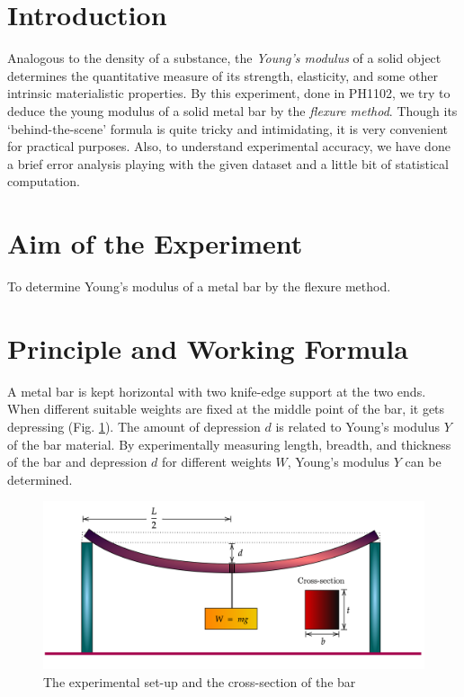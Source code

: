 \documentclass[11pt]{scrartcl}
\begin{document}
\section{Introduction}
\fontsize{12}{18}\selectfont
Analogous to the density of a substance, the \emph{Young's modulus} of a solid object determines the quantitative measure of its strength, elasticity, and some other intrinsic materialistic properties. By this experiment, done in PH1102, we try to deduce the young modulus of a solid metal bar by the \emph{flexure method}. Though its `behind-the-scene' formula is quite tricky and intimidating, it is very convenient for practical purposes. Also, to understand experimental accuracy, we have done a brief error analysis playing with the given dataset and a little bit of statistical computation.

\section{Aim of the Experiment}
To determine Young's modulus of a metal bar by the flexure method.

\section{Principle and Working Formula}
A metal bar is kept horizontal with two knife-edge support at the two ends. When different suitable weights are fixed at the middle point of the bar, it gets depressing (Fig. \ref{fig:bar1}). The amount of depression \(d\) is related to Young's modulus \(Y\) of the bar material. By experimentally measuring length, breadth, and thickness of the bar and depression \(d\) for different weights \(W\), Young's modulus \(Y\) can be determined.

\begin{figure}[h]
    \centering
    \includegraphics[scale=0.15]{diagram-20220212 (1).png}
    \caption{The experimental set-up and the cross-section of the bar}
    \label{fig:bar1}
\end{figure}
\end{document}
